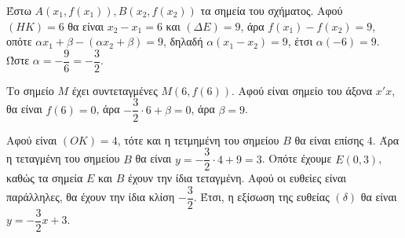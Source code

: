 
\begin{alist}
\item Έστω $A(x_1, f(x_1)), B(x_2, f(x_2))$ τα σημεία του σχήματος. 
Αφού $(HK) = 6$ θα είναι $x_2 - x_1 = 6$
και $(\Delta E) = 9$, άρα $f(x_1) - f(x_2) = 9$, οπότε $\alpha x_1 + \beta - (\alpha x_2 + \beta) = 9$, δηλαδή
$\alpha(x_1 - x_2) = 9$, έτσι $\alpha(-6) = 9$. Ώστε $\alpha = -\dfrac{9}{6} = -\dfrac{3}{2}$.

\item Το σημείο $M$ έχει συντεταγμένες $M(6, f(6))$. 
Αφού είναι σημείο του άξονα $x'x$, θα είναι $f(6) = 0$, άρα $-\dfrac{3}{2} \cdot 6 + \beta = 0$, άρα $\beta = 9$.

\item Αφού είναι $(OK) = 4$, τότε και η τετμημένη του σημείου $B$ θα είναι επίσης $4$. 
Άρα η τεταγμένη του σημείου $B$ θα είναι $y = -\dfrac{3}{2} \cdot 4 + 9 = 3$. 
Οπότε έχουμε $E(0, 3)$, καθώς τα σημεία $E$ και $B$ έχουν την ίδια τεταγμένη. 
Αφού οι ευθείες είναι παράλληλες, θα έχουν την ίδια κλίση $-\dfrac{3}{2}$.
Έτσι, η εξίσωση της ευθείας $(\delta)$ θα είναι $y = -\dfrac{3}{2} x + 3$.
\end{alist}

